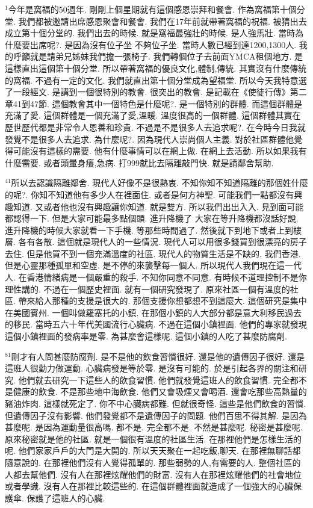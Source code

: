 \documentclass{book}
\begin{document}
$^{1}$今年是窩福的50週年.
剛剛上個星期就有這個感恩崇拜和餐會.
作為窩福第十個分堂.
我們都被邀請出席感恩聚會和餐會.
我們在17年前就帶著窩福的祝福.
被猜出去成立第十個分堂的.
我們出去的時候.
就是窩福最強壯的時候.
是人強馬壯.
當時為什麼要出席呢?.
是因為沒有位子坐 不夠位子坐.
當時人數已經到達1200,1300人.
我的呼籲就是請弟兄姊妹我們擔一張椅子.
我們轉個位子去前面YMCA租個地方.
是這樣直出這個第十個分堂.
所以帶著窩福的優良文化,體制,傳統.
其實沒有什麼傳統的窩福.
不過有一定的文化.
我們就直出第十個分堂成為望福堂.
所以今天我特意選了一段經文.
是講到一個很特別的教會.
很突出的教會.
是記載在《使徒行傳》第二章41到47節.
這個教會其中一個特色是什麼呢?.
是一個特別的群體.
而這個群體是充滿了愛.
這個群體是一個充滿了愛,溫暖.
溫度很高的一個群體.
這個群體其實在歷世歷代都是非常令人恩善和珍貴.
不過是不是很多人去追求呢?.
在今時今日我就發覺不是很多人去追求.
為什麼呢?.
因為現代人崇尚個人主義.
對於社區群體他覺得可能沒有這樣的需要.
他有什麼事情可以在網上做.
在網上去活動.
所以如果我有什麼需要.
或者頭暈身癢,急病.
打999就比去隔離敲門快.
就是請鄰舍幫助.

$^{41}$所以去認識隔離鄰舍.
現代人好像不是很熱衷.
不知你知不知道隔離的那個姓什麼的呢?.
你知不知道他有多少人在裡面住.
或者是何方神聖.
可能我們一點都沒有興趣知道.
又或者他也沒有興趣讓你知道.
就是雙方.
所以我們出出入入.
見到面可能都認得一下.
但是大家可能最多點個頭.
進升降機了 大家在等升降機都沒話好說.
進升降機的時候大家就看一下手機.
等那些時間過了.
然後就下到地下或者上到樓層.
各有各散.
這個就是現代人的一些情況.
現代人可以用很多錢買到很漂亮的房子去住.
但是他買不到一個充滿溫度的社區.
現代人的物質生活是不缺的.
我們香港.
但是心靈那種孤單和空虛.
是不停的來襲擊每一個人.
所以現代人我們現在這一代人.
在香港情緒病是一個嚴重的殺手.
不知你同意不同意.
有時候不道理控制不是你理性講的.
不過在一個歷史裡面.
就有一個研究發現了.
原來社區一個有溫度的社區.
帶來給人那種的支援是很大的.
那個支援你想都想不到這麼大.
這個研究是集中在美國賓州.
一個叫做羅塞托的小鎮.
在那個小鎮的人大部分都是意大利移民過去的移民.
當時五六十年代美國流行心臟病.
不過在這個小鎮裡面.
他們的專家就發現這個小鎮裡面的發病率是零.
為甚麼會這樣呢.
這個小鎮的人吃了甚麼防腐劑.

$^{81}$剛才有人問甚麼防腐劑.
是不是他的飲食習慣很好.
還是他的遺傳因子很好.
還是這班人很勤力做運動.
心臟病發是等於零.
是沒有可能的.
於是引起各界的關注和研究.
他們就去研究一下這些人的飲食習慣.
他們就發覺這班人的飲食習慣.
完全都不是健康的飲食.
不是那些地中海飲食.
他們又會吸煙又會喝酒.
還會吃那些高熱量的豬油炸肉.
這樣就死定了.
你不中心臟病都難.
但就很奇怪.
這些是他們飲食的習慣.
但遺傳因子沒有影響.
他們發覺都不是遺傳因子的問題.
他們百思不得其解.
是因為甚麼呢.
是因為運動量很高嗎.
都不是.
完全都不是.
不然是甚麼呢.
秘密是甚麼呢.
原來秘密就是他的社區.
就是一個很有溫度的社區生活.
在那裡他們是怎樣生活的呢.
他們家家戶戶的大門是大開的.
所以天天聚在一起吃飯,聊天.
在那裡無聊話都隨意說的.
在那裡他們沒有人覺得孤單的.
那些弱勢的人,有需要的人.
整個社區的人都去幫他們.
沒有人在那裡炫耀他們的財富.
沒有人在那裡炫耀他們的社會地位或者學識.
沒有人在那裡比較這些的.
在這個群體裡面就造成了一個強大的心臟保護傘.
保護了這班人的心臟.
\end{document}
